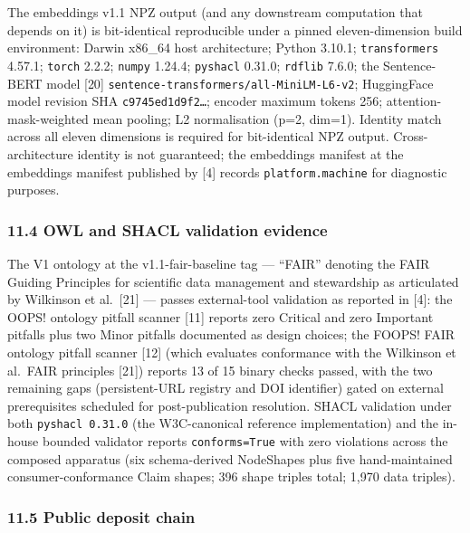 \documentclass[
]{article}
\begin{document}
The embeddings v1.1 NPZ output (and any downstream computation that
depends on it) is bit-identical reproducible under a pinned
eleven-dimension build environment: Darwin x86\_64 host architecture;
Python 3.10.1; \texttt{transformers} 4.57.1; \texttt{torch} 2.2.2;
\texttt{numpy} 1.24.4; \texttt{pyshacl} 0.31.0; \texttt{rdflib} 7.6.0;
the Sentence-BERT model {[}20{]}
\texttt{sentence-transformers/all-MiniLM-L6-v2}; HuggingFace model
revision SHA \texttt{c9745ed1d9f2…}; encoder maximum tokens 256;
attention-mask-weighted mean pooling; L2 normalisation (p=2, dim=1).
Identity match across all eleven dimensions is required for
bit-identical NPZ output. Cross-architecture identity is not guaranteed;
the embeddings manifest at the embeddings manifest published by {[}4{]}
records \texttt{platform.machine} for diagnostic purposes.

\subsubsection{11.4 OWL and SHACL validation
evidence}\label{owl-and-shacl-validation-evidence}

The V1 ontology at the v1.1-fair-baseline tag --- ``FAIR'' denoting the
FAIR Guiding Principles for scientific data management and stewardship
as articulated by Wilkinson et al.~{[}21{]} --- passes external-tool
validation as reported in {[}4{]}: the OOPS! ontology pitfall scanner
{[}11{]} reports zero Critical and zero Important pitfalls plus two
Minor pitfalls documented as design choices; the FOOPS! FAIR ontology
pitfall scanner {[}12{]} (which evaluates conformance with the Wilkinson
et al.~FAIR principles {[}21{]}) reports 13 of 15 binary checks passed,
with the two remaining gaps (persistent-URL registry and DOI identifier)
gated on external prerequisites scheduled for post-publication
resolution. SHACL validation under both \texttt{pyshacl\ 0.31.0} (the
W3C-canonical reference implementation) and the in-house bounded
validator reports \texttt{conforms=True} with zero violations across the
composed apparatus (six schema-derived NodeShapes plus five
hand-maintained consumer-conformance Claim shapes; 396 shape triples
total; 1,970 data triples).

\subsubsection{11.5 Public deposit chain}\label{public-deposit-chain}
\end{document}
